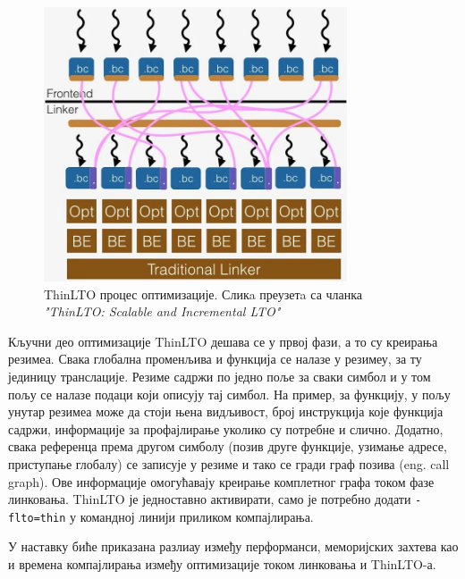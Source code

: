 \documentclass[12pt,oneside]{memoir}
\begin{document}
\begin{figure}[!ht]
  \centering
  \includegraphics[width=0.8\textwidth]{LTO_thin.png}
  \caption{ThinLTO процес оптимизације. Сликa преузетa са чланка \textit{"ThinLTO: Scalable and Incremental LTO"}}
  \label{fig:grafikon}
\end{figure}

Кључни део оптимизације ThinLTO дешава се у првој фази, а то су креирања резимеа.
Свака глобална променљива и функција се налазе у резимеу, за ту јединицу транслације.
Резиме садржи по једно поље за сваки симбол и у том пољу
се налазе подаци који описују тај симбол.
На пример, за функцију, у пољу унутар резимеа може да стоји њена видљивост, 
број инструкција које функција садржи, информације за профајлирање уколико су потребне
и слично.
Додатно, свака референца према другом симболу (позив друге функције, узимање адресе,
приступање глобалу) се записује у резиме и тако се гради граф позива (eng. call graph).
Ове информације омогућавају креирање комплетног графа током фазе линковања.
ThinLTO је једноставно активирати, само је потребно додати  \texttt{-flto=thin} у командној линији
приликом компајлирања.

У наставку биће приказана разлиау између перформанси, меморијских захтева као и времена
компајлирања између оптимизације током линковања и ThinLTO-а.
\end{document}
